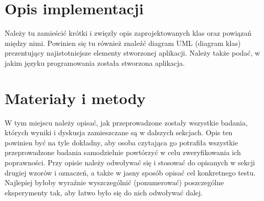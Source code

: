 \documentclass{classrep}
\begin{document}
\section{Opis implementacji}
{\color{blue}
Należy tu zamieścić krótki i zwięzły opis zaprojektowanych klas oraz powiązań
między nimi. Powinien się tu również znaleźć diagram UML (diagram klas)
prezentujący najistotniejsze elementy stworzonej aplikacji. Należy także podać,
w jakim języku programowania została stworzona aplikacja.}

\section{Materiały i metody}
{\color{blue}
W tym miejscu należy opisać, jak przeprowadzone zostały wszystkie badania,
których wyniki i dyskusja zamieszczane są w dalszych sekcjach. Opis ten
powinien być na tyle dokładny, aby osoba czytająca go potrafiła wszystkie
przeprowadzone badania samodzielnie powtórzyć w celu zweryfikowania ich
poprawności. Przy opisie należy odwoływać się i stosować do
opisanych w sekcji drugiej wzorów i oznaczeń, a także w jasny sposób opisać
cel konkretnego testu. Najlepiej byłoby wyraźnie wyszczególnić (ponumerować)
poszczególne eksperymenty tak, aby łatwo było się do nich odwoływać dalej.}
\end{document}
